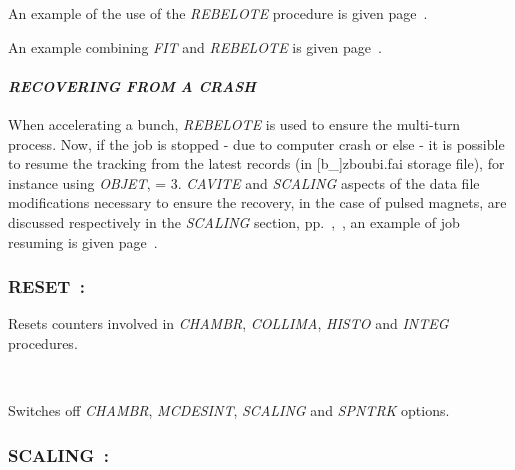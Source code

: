 \noindent  An example of the use of the \textsl{REBELOTE} procedure is given page~\pageref{ExaREBELOTE}. 

\bigskip

\noindent  An example combining \textsl{FIT} and \textsl{REBELOTE} is given page~\pageref{ExaFITREBELOTE}. 



\paragraph{\textit{RECOVERING FROM A CRASH}}

\noindent When accelerating a bunch, \textsl{REBELOTE} is used to ensure the multi-turn process. 
Now, if the job is stopped - due to computer crash or else -  it is possible to resume the tracking 
from the latest records (in [b\_]zboubi.fai storage file), for instance using \textsl{OBJET}, \KOBJ = 3.
  \textsl{CAVITE} and  \textsl{SCALING} aspects of the data file modifications necessary to ensure the recovery, 
in the case of pulsed magnets,  are 
discussed respectively in the \textsl{SCALING} section, pp.~\pageref{SCALING},~\pageref{CrashSCALING}, 
 an example of job resuming is given  page~\pageref{ExaOBJ3Recovery}. 








\newpage

\subsubsection*{RESET~: \textbf{\RESETTitl} } \label{RESET} 
\medskip 

 \noindent Resets counters involved  in \textsl{CHAMBR}, \textsl{COLLIMA},   
  \textsl{HISTO} and \textsl{INTEG} procedures. 
 
~

 \noindent Switches off \textsl{CHAMBR}, \textsl{MCDESINT}, \textsl{SCALING} and 
 \textsl{SPNTRK} options. 






 \newpage

\subsubsection*{SCALING~: \SCALINGTitl} \label{SCALING}  
\medskip 
{}

